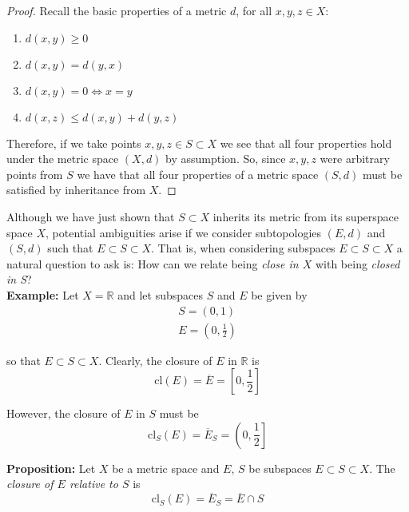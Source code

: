 \documentclass[12pt]{article}
\newlength\tindent
\renewcommand{\indent}{\hspace*{\tindent}}
\newcommand{\R}{\mathbb R}
\newcommand{\cl}{\mathrm{cl}} %
\begin{document}
\begin{proof} Recall the basic properties of a metric $d$, for all $x,y,z \in X$:
\begin{enumerate}
	\item $d(x, y) \geq 0$ 
	\item $d(x, y) = d(y, x)$ 
	\item $d(x, y) = 0 \iff x = y$
	\item $d(x, z) \leq d(x, y) + d(y, z)$
\end{enumerate}

\indent Therefore, if we take points $x, y, z \in S \subset X$ we see that all four properties hold under the metric space $(X,d)$ by assumption. So, since $x, y, z$ were arbitrary points from $S$ we have that all four properties of a metric space $(S, d)$ must be satisfied by inheritance from $X$.
\end{proof}

\indent Although we have just shown that $S \subset X$ inherits its metric from its superspace space $X$, potential ambiguities arise if we consider subtopologies $(E, d)$ and $(S, d)$ such that $E \subset S \subset X$. That is, when considering subspaces $E \subset S \subset X$ a natural question to ask is: How can we relate being {\em close in $X$} with being {\em closed in S}? \\

%
%
{\bf Example:} Let $X = \R$ and let subspaces $S$ and $E$ be given by
\begin{align*}
	S = (0, 1) \\
	E = \left( 0, \frac{1}{2} \right)
\end{align*}

so that $E \subset S \subset X$. Clearly, the closure of $E$ in $\mathbb R$ is
\begin{equation*}
	\cl(E) = \overline{E} = \left[ 0, \frac{1}{2} \right] 
\end{equation*}

However, the closure of $E$ in $S$ must be
\begin{equation*}
	\cl_S(E) = \overline{E}_S = \left( 0, \frac{1}{2} \right]
\end{equation*}

%
% 
{\bf Proposition:} Let $X$ be a metric space and $E$, $S$ be subspaces $E \subset S \subset X$. The {\em closure of $E$ relative to $S$} is
\begin{equation*}
	\cl_S(E) = \overline{E}_S = \overline{E}\cap S
\end{equation*}
\end{document}
